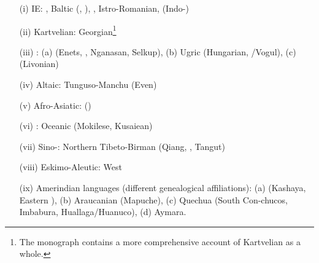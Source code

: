 \documentclass[output=paper]{langsci/langscibook}
\begin{document}
\begin{enumerate}
\item[(i)]  IE: , Baltic (, ), , Istro-Romanian,  (Indo-)
\item[(ii)]  Kartvelian: Georgian\footnote{The monograph \citet{Arkadiev2015} contains a more comprehensive account of Kartvelian as a whole.}
\item[(iii)] : (a)  (Enets, , Nganasan, Selkup), (b) Ugric (Hungarian, /Vogul), (c)  (Livonian)
\item[(iv)]  Altaic: Tunguso-Manchu (Even)
\item[(v)]    Afro-Asiatic:  ()
\item[(vi)]  : Oceanic (Mokilese, Kusaiean)
\item[(vii)]  Sino-: Northern Tibeto-Birman (Qiang, , Tangut)
\item[(viii)]  Eskimo-Aleutic: West 
\item[(ix)]  Amerindian languages (different genealogical affiliations): (a)  (Kashaya, Eastern ), (b) Araucanian (Mapuche), (c) Quechua (South Con-\linebreak chucos, Imbabura, Huallaga/Huanuco), (d) Aymara.
\end{enumerate}
\end{document}
